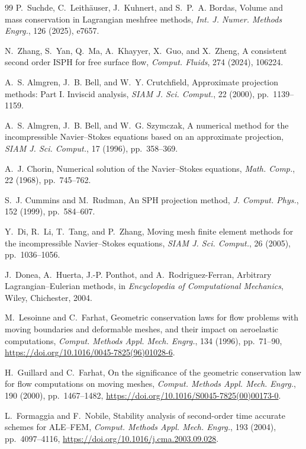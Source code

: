 \documentclass[11pt]{article}
\theoremstyle{plain}
\theoremstyle{definition}
\theoremstyle{remark}
\begin{document}
\begin{thebibliography}{99}
P.~Suchde, C.~Leith\"auser, J.~Kuhnert, and S.~P.~A. Bordas,
Volume and mass conservation in Lagrangian meshfree methods,
\emph{Int. J. Numer. Methods Engrg.}, 126 (2025), e7657.

N.~Zhang, S.~Yan, Q.~Ma, A.~Khayyer, X.~Guo, and X.~Zheng,
A consistent second order ISPH for free surface flow,
\emph{Comput. Fluids}, 274 (2024), 106224.

A.~S. Almgren, J.~B. Bell, and W.~Y. Crutchfield,
Approximate projection methods: Part I. Inviscid analysis,
\emph{SIAM J. Sci. Comput.}, 22 (2000), pp.~1139--1159.

A.~S. Almgren, J.~B. Bell, and W.~G. Szymczak,
A numerical method for the incompressible Navier--Stokes equations based on an
approximate projection,
\emph{SIAM J. Sci. Comput.}, 17 (1996), pp.~358--369.

A.~J. Chorin,
Numerical solution of the Navier--Stokes equations,
\emph{Math. Comp.}, 22 (1968), pp.~745--762.

S.~J. Cummins and M.~Rudman,
An SPH projection method,
\emph{J. Comput. Phys.}, 152 (1999), pp.~584--607.

Y.~Di, R.~Li, T.~Tang, and P.~Zhang,
Moving mesh finite element methods for the incompressible Navier--Stokes
equations,
\emph{SIAM J. Sci. Comput.}, 26 (2005), pp.~1036--1056.

J.~Donea, A.~Huerta, J.-P. Ponthot, and A.~Rodriguez-Ferran,
Arbitrary Lagrangian--Eulerian methods,
in \emph{Encyclopedia of Computational Mechanics}, Wiley, Chichester, 2004.

M.~Lesoinne and C.~Farhat,
Geometric conservation laws for flow problems with moving boundaries and
deformable meshes, and their impact on aeroelastic computations,
\emph{Comput. Methods Appl. Mech. Engrg.}, 134 (1996), pp.~71--90,
\url{https://doi.org/10.1016/0045-7825(96)01028-6}.

H.~Guillard and C.~Farhat,
On the significance of the geometric conservation law for flow computations
on moving meshes,
\emph{Comput. Methods Appl. Mech. Engrg.}, 190 (2000), pp.~1467--1482,
\url{https://doi.org/10.1016/S0045-7825(00)00173-0}.

L.~Formaggia and F.~Nobile,
Stability analysis of second-order time accurate schemes for ALE--FEM,
\emph{Comput. Methods Appl. Mech. Engrg.}, 193 (2004), pp.~4097--4116,
\url{https://doi.org/10.1016/j.cma.2003.09.028}.


\end{thebibliography}
\end{document}
